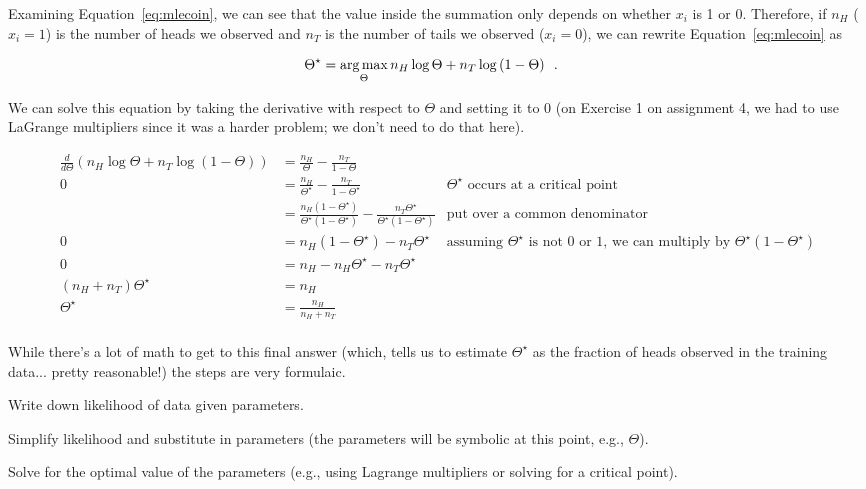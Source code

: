 \documentclass{tufte-handout}
\begin{document}
Examining Equation~\ref{eq:mlecoin}, we can see that the value inside the summation only depends on whether $x_i$ is 1 or 0.  Therefore, if $n_{H}$ ($x_i = 1$) is the number of heads we observed and $n_{T}$ is the number of tails we observed ($x_i = 0$), we can rewrite Equation~\ref{eq:mlecoin} as


\begin{align}
\Theta^\star &= \operatorname*{arg\,max}_{\Theta} n_H \log \Theta  + n_T  \log\left (1-  \Theta \right) \label{eq:mlecoincount} \enspace .
\end{align}

We can solve this equation by taking the derivative with respect to $\Theta$ and setting it to 0 (on Exercise 1 on assignment 4, we had to use LaGrange multipliers since it was a harder problem; we don't need to do that here).

\begin{align}
\frac{d}{d\Theta} \left ( n_H \log \Theta  + n_T  \log\left (1-  \Theta \right) \right) &=  \frac{n_H}{\Theta} - \frac{n_T}{1-\Theta} \nonumber \\
0 &= \frac{n_H}{\Theta^\star} - \frac{n_T}{1-\Theta^\star} \nonumber & \mbox{$\Theta^\star$ occurs at a critical point}\\
&= \frac{n_H(1-\Theta^\star)}{\Theta^\star(1-\Theta^\star)} - \frac{n_T \Theta^\star}{\Theta^\star(1-\Theta^\star)}&\mbox{put over a common denominator}\nonumber\\
0 &=  n_H(1-\Theta^\star) - n_T \Theta^\star &\mbox{assuming $\Theta^\star$ is not 0 or 1, we can multiply by $\Theta^\star(1-\Theta^\star)$} \nonumber \\
0&= n_H - n_H \Theta^\star -  n_T \Theta^\star \nonumber \\
(n_H + n_T) \Theta^\star &= n_H \nonumber \\
\Theta^\star &= \frac{n_H}{n_H + n_T} \nonumber \\
\end{align}

While there's a lot of math to get to this final answer (which, tells us to estimate $\Theta^\star$ as the fraction of heads observed in the training data... pretty reasonable!) the steps are very formulaic.
\be
\item Write down likelihood of data given parameters.
\item Simplify likelihood and substitute in parameters (the parameters will be symbolic at this point, e.g., $\Theta$).
\item Solve for the optimal value of the parameters (e.g., using Lagrange multipliers or solving for a critical point).
\ee
\end{document}
